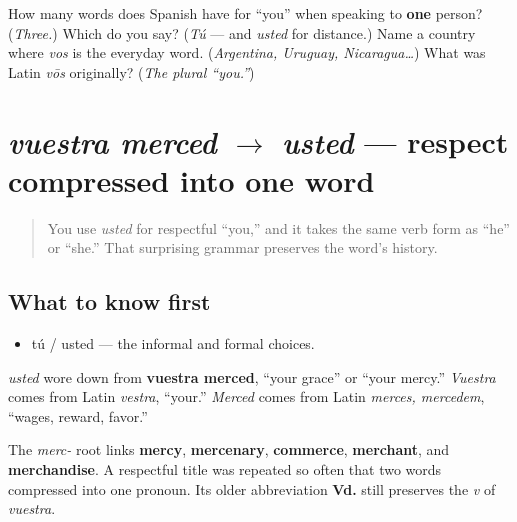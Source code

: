 \begin{tcolorbox}[breakable,colback=teal!4,colframe=teal!35!black,title={Before you move on}]
How many words does Spanish have for \textquotedblleft{}you\textquotedblright{} when speaking to \textbf{one} person? (\emph{Three.}) Which do you say? (\emph{Tú} — and \emph{usted} for distance.) Name a country where \emph{vos} is the everyday word. (\emph{Argentina, Uruguay, Nicaragua…}) What was Latin \emph{vōs} originally? (\emph{The plural \textquotedblleft{}you.\textquotedblright{}})
\end{tcolorbox}
\section[vuestra merced to usted]{\emph{vuestra merced} $\to$ \emph{usted} — respect compressed into one word}

\label{lesson:ES-C03-usted-origin}



\begin{quote}
You use \emph{usted} for respectful \textquotedblleft{}you,\textquotedblright{} and it takes the same verb form as \textquotedblleft{}he\textquotedblright{} or \textquotedblleft{}she.\textquotedblright{} That surprising grammar preserves the word's history.
\end{quote}

\subsection*{What to know first}
\begin{itemize}
\raggedright
  \item tú / usted — the informal and formal choices.
\end{itemize}

\begin{cousinweb}
\emph{usted} wore down from \textbf{vuestra merced}, \textquotedblleft{}your grace\textquotedblright{} or \textquotedblleft{}your mercy.\textquotedblright{} \emph{Vuestra} comes from Latin \emph{vestra}, \textquotedblleft{}your.\textquotedblright{} \emph{Merced} comes from Latin \emph{merces, mercedem}, \textquotedblleft{}wages, reward, favor.\textquotedblright{}

The \emph{merc-} root links \textbf{mercy}, \textbf{mercenary}, \textbf{commerce}, \textbf{merchant}, and \textbf{merchandise}. A respectful title was repeated so often that two words compressed into one pronoun. Its older abbreviation \textbf{Vd.} still preserves the \emph{v} of \emph{vuestra}.
\end{cousinweb}


